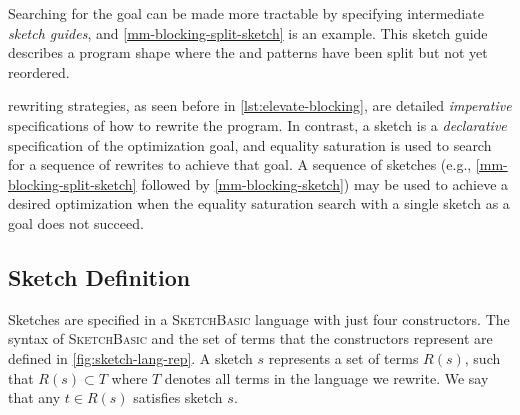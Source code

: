 Searching for the  goal can be made more tractable by specifying intermediate \emph{sketch guides}, and \cref{mm-blocking-split-sketch} is an example.
This sketch guide describes a program shape where the  and  patterns have been split but not yet reordered.

\Elevate{} rewriting strategies, as seen before in \cref{lst:elevate-blocking}, are detailed \emph{imperative} specifications of how to rewrite the program. In contrast, a sketch is a \emph{declarative} specification of the optimization goal, and equality saturation is used to search for a sequence of rewrites to achieve that goal.
A sequence of sketches (e.g., \cref{mm-blocking-split-sketch} followed by \cref{mm-blocking-sketch}) may be used to achieve a desired optimization when the equality saturation search with a single sketch as a goal does not succeed.





\subsection{Sketch Definition}
\label{sketch-def}


\newcommand{\sLang}{\textsc{SketchBasic}}

Sketches are specified in a  \sLang{} language with just four constructors.
The  syntax of \sLang{} and the set of terms that the constructors represent are defined in \cref{fig:sketch-lang-rep}.
A sketch $s$ represents a set of terms $R(s)$, such that $R(s) \subset T$ where $T$ denotes all terms in the language we rewrite.
We say that any $t \in R(s)$ satisfies sketch $s$.

